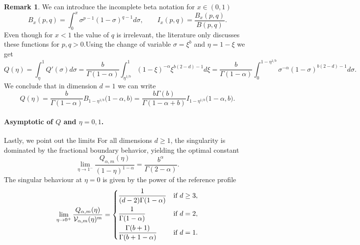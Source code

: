 \documentclass[a4paper]{article}
\theoremstyle{definition}
\newtheorem{remark}[theorem]{Remark}
\begin{document}
\begin{remark}
  We can introduce the incomplete beta notation for $x \in (0,1)$
  \begin{equation*}
    B_x(p,q) = \int_0^x \sigma^{p-1} (1-\sigma)^{q-1} d \sigma, \qquad I_x(p,q) = \frac {B_x(p,q)} {B(p,q)} .
  \end{equation*}
  Even though for $x < 1$ the value of $q$ is irrelevant, the literature only discusses these functions for $p,q > 0$.Using the change of variable $\sigma = \xi^b$ and $\eta=1-\xi$ we get
  \begin{equation*}
    Q(\eta) = \int_{\eta}^1 Q'(\sigma) d \sigma = \frac b {\Gamma(1-\alpha)} \int_{\eta^{1/b}}^1 {(1-\xi)^{-\alpha} \xi^{b(2-d) - 1 }} d \xi = \frac b {\Gamma(1-\alpha)} \int_0^{1-\eta^{1/b}} {\sigma^{-\alpha} (1-\sigma)^{b(2-d) - 1 }} d \sigma.
  \end{equation*}
  We conclude that in dimension $d=1$ we can write
  \begin{equation}
    \label{eq:Q from incomplete gammas}
    Q(\eta) = \frac{b}{\Gamma(1-\alpha)} B_{1-\eta^{1/b}}\Big(1-\alpha, b\Big) = \frac{b \Gamma(b)}{\Gamma(1-\alpha + b)} I_{1-\eta^{1/b}}\Big(1-\alpha, b\Big).
  \end{equation}
\end{remark}

\paragraph{Asymptotic of $Q$ and $\eta = 0, 1$.}
Lastly, we point out the limits
For all dimensions $d \ge 1$, the singularity is dominated by the fractional boundary behavior, yielding the optimal constant
\[
  \lim_{\eta \to 1^-} \frac{Q_{\alpha,m}(\eta)}{(1-\eta)^{1-\alpha}} = \frac{b^\alpha}{\Gamma(2-\alpha)}.
\]
%
%
%
%
%
%
The singular behaviour at $\eta = 0$ is given by the power of the reference profile
\begin{equation}
  \label{eq:Q at 0}
  \lim_{\eta \to 0^+} \frac{Q_{\alpha,m}(\eta)}{\mathcal V_{\alpha,m}(\eta)^m} =
  \begin{dcases}
    \frac{1}{(d-2)\Gamma(1-\alpha)} & \text{if } d \ge 3 , \\
    \frac{1}{\Gamma(1-\alpha)} & \text{if } d =2 , \\
    \frac{\Gamma(b+1)}{\Gamma(b+1-\alpha)} & \text{if } d=1.
  \end{dcases}
\end{equation}

%
%
%
\end{document}
